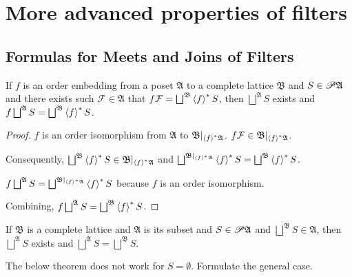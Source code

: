 \section{More advanced properties of filters}


\subsection{Formulas for Meets and Joins of Filters}
\begin{lem}
\label{embed-lemma}If $f$ is an order embedding from a poset $\mathfrak{A}$
to a complete lattice $\mathfrak{B}$ and $S\in\mathscr{P}\mathfrak{A}$
and there exists such $\mathcal{F}\in\mathfrak{A}$ that $f\mathcal{F}=\bigsqcup^{\mathfrak{B}}\rsupfun fS$,
then $\bigsqcup^{\mathfrak{A}}S$ exists and $f\bigsqcup^{\mathfrak{A}}S=\bigsqcup^{\mathfrak{B}}\rsupfun fS$.\end{lem}
\begin{proof}
$f$ is an order isomorphism from $\mathfrak{A}$ to $\mathfrak{B}|_{\left\langle f\right\rangle ^{\ast}\mathfrak{A}}$.
$f\mathcal{F}\in\mathfrak{B}|_{\left\langle f\right\rangle ^{\ast}\mathfrak{A}}$.

Consequently, $\bigsqcup^{\mathfrak{B}}\rsupfun fS\in\mathfrak{B}|_{\rsupfun f\mathfrak{A}}$
and $\bigsqcup^{\mathfrak{B}|_{\rsupfun f\mathfrak{A}}}\rsupfun fS=\bigsqcup^{\mathfrak{B}}\rsupfun fS$.

$f\bigsqcup^{\mathfrak{A}}S=\bigsqcup^{\mathfrak{B}|_{\rsupfun f\mathfrak{A}}}\rsupfun fS$
because $f$ is an order isomorphism.

Combining, $f\bigsqcup^{\mathfrak{A}}S=\bigsqcup^{\mathfrak{B}}\rsupfun fS$.\end{proof}
\begin{cor}
If $\mathfrak{B}$ is a complete lattice and $\mathfrak{A}$ is its
subset and $S\in\mathscr{P}\mathfrak{A}$ and $\bigsqcup^{\mathfrak{B}}S\in\mathfrak{A}$,
then $\bigsqcup^{\mathfrak{A}}S$
exists and $\bigsqcup^{\mathfrak{A}}S=\bigsqcup^{\mathfrak{B}}S$.\end{cor}

\begin{xca}
The below theorem does not work for $S=\emptyset$. Formulate the general case.
\end{xca}

